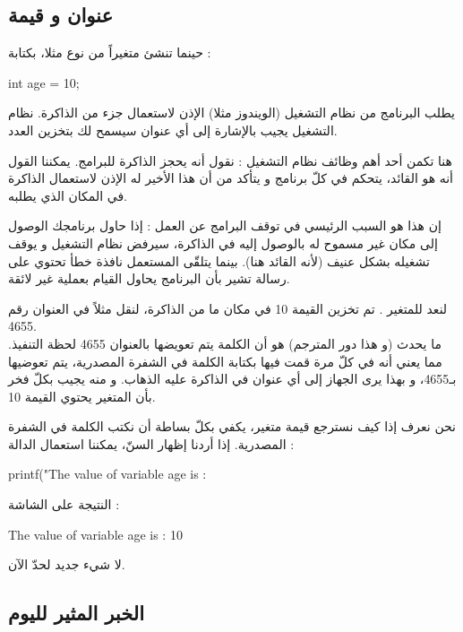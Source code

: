 \subsection{عنوان و قيمة}

حينما تنشئ متغيراً
من نوع
مثلا، بكتابة :

\begin{Csource}
int age = 10;
\end{Csource}

يطلب البرنامج من نظام التشغيل (الويندوز مثلا) الإذن لاستعمال جزء من الذاكرة. نظام التشغيل يجيب بالإشارة إلى أي عنوان سيسمح لك بتخزين العدد.

هنا تكمن أحد أهم وظائف نظام التشغيل : نقول أنه يحجز الذاكرة للبرامج. يمكننا القول أنه هو القائد، يتحكم في كلّ برنامج و يتأكد من أن هذا الأخير له الإذن لاستعمال الذاكرة في المكان الذي يطلبه.

\begin{information}
إن هذا هو السبب الرئيسي في توقف البرامج عن العمل : إذا حاول برنامجك الوصول إلى مكان غير مسموح له بالوصول إليه في الذاكرة، سيرفض نظام التشغيل و يوقف تشغيله بشكل عنيف (لأنه القائد هنا). بينما يتلقّى المستعمل نافذة خطأ تحتوي على رسالة تشير بأن البرنامج يحاول القيام بعملية غير لائقة.
\end{information}

لنعد للمتغير
.
تم تخزين القيمة 10 في مكان ما من الذاكرة، لنقل مثلاً في العنوان رقم 4655.\\
ما يحدث (و هذا دور المترجم) هو أن الكلمة
يتم تعويضها بالعنوان 4655 لحظة التنفيذ. مما يعني أنه في كلّ مرة قمت فيها بكتابة الكلمة
في الشفرة المصدرية، يتم تعوضيها بـ4655، و بهذا يرى الجهاز إلى أي عنوان في الذاكرة عليه الذهاب. و منه يجيب بكلّ فخر بأن المتغير
يحتوي القيمة 10.

نحن نعرف إذا كيف نسترجع قيمة متغير، يكفي بكلّ بساطة أن نكتب الكلمة
في الشفرة المصدرية. إذا أردنا إظهار السنّ، يمكننا استعمال الدالة
 :

\begin{Csource}
printf("The value of variable age is : %
\end{Csource}

النتيجة على الشاشة :

\begin{Console}
The value of variable age is : 10
\end{Console}

لا شيء جديد لحدّ الآن.

\subsection{الخبر المثير لليوم}

